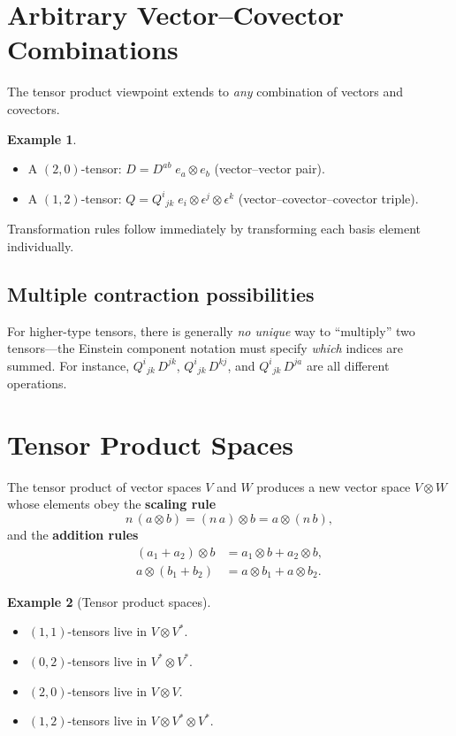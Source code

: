 \documentclass[12pt, a4paper]{report}
\theoremstyle{definition}
\newtheorem{example}{Example}[chapter]
\theoremstyle{plain}
\theoremstyle{remark}
\begin{document}
\section{Arbitrary Vector--Covector Combinations}

The tensor product viewpoint extends to \emph{any} combination of vectors and
covectors.

\begin{example}\leavevmode
\begin{itemize}[nosep]
    \item A $(2,0)$-tensor: $D = D^{ab}\; e_a \otimes e_b$ \quad (vector--vector
          pair).
    \item A $(1,2)$-tensor: $Q = Q^{i}{}_{jk}\; e_i \otimes \epsilon^{j}
          \otimes \epsilon^{k}$ \quad (vector--covector--covector triple).
\end{itemize}
\end{example}

Transformation rules follow immediately by transforming each basis element
individually.

\subsection*{Multiple contraction possibilities}

For higher-type tensors, there is generally \emph{no unique} way to ``multiply''
two tensors---the Einstein component notation must specify \emph{which} indices are
summed.  For instance, $Q^{i}{}_{jk}\,D^{jk}$, $Q^{i}{}_{jk}\,D^{kj}$,
and $Q^{i}{}_{jk}\,D^{ja}$ are all different operations.

\section{Tensor Product Spaces}

The tensor product of vector spaces $V$ and $W$ produces a new vector space
$V \otimes W$ whose elements obey the \textbf{scaling rule}
\[
    n\,(a \otimes b) = (n\,a) \otimes b = a \otimes (n\,b),
\]
and the \textbf{addition rules}
\begin{align}
    (a_1 + a_2) \otimes b &= a_1 \otimes b + a_2 \otimes b, \\
    a \otimes (b_1 + b_2) &= a \otimes b_1 + a \otimes b_2.
\end{align}

\begin{example}[Tensor product spaces]\leavevmode
\begin{itemize}[nosep]
    \item $(1,1)$-tensors live in $V \otimes V^*$.
    \item $(0,2)$-tensors live in $V^* \otimes V^*$.
    \item $(2,0)$-tensors live in $V \otimes V$.
    \item $(1,2)$-tensors live in $V \otimes V^* \otimes V^*$.
\end{itemize}
\end{example}
\end{document}
